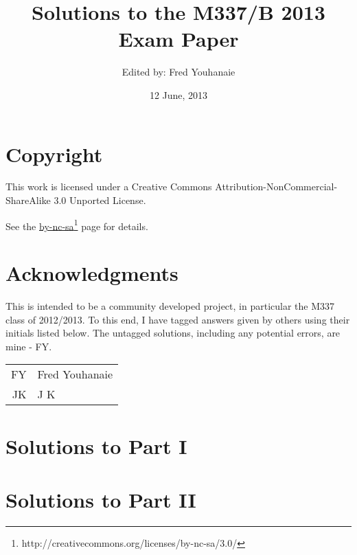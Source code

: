 \documentclass[a4paper,fleqn,12pt,twoside]{article}
\title{Solutions to the M337/B 2013 Exam Paper}
\author{Edited by: Fred Youhanaie}
\date{12 June, 2013}
\begin{document}
\maketitle

\pagestyle{myheadings}

\section*{Copyright}

This work is licensed under a Creative Commons
Attribution-NonCommercial-ShareAlike 3.0 Unported License.

\newcommand\cclink{http://creativecommons.org/licenses/by-nc-sa/3.0/}
See the \href{\cclink}{by-nc-sa}\footnote{\cclink} page for details.

\section*{Acknowledgments}

This is intended to be a community developed project, in particular the
M337 class of 2012/2013. To this end, I have tagged answers given by
others using their initials listed below. The untagged solutions, including
any potential errors, are mine - FY.

\medskip

\begin{tabular}{r|l}
\hline
FY	& Fred Youhanaie \\
JK	& J K \\
\hline
\end{tabular}

\section*{Solutions to Part I}

\newpage

\newpage

\newpage

\newpage

\newpage

\newpage

\newpage

\newpage

\section*{Solutions to Part II}

\newpage

\newpage

\newpage

\end{document}
